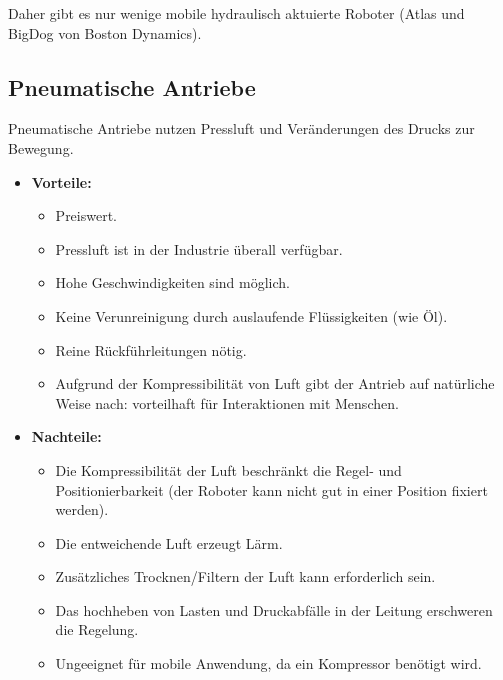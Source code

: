 			Daher gibt es nur wenige mobile hydraulisch aktuierte Roboter (\zB Atlas und BigDog von Boston Dynamics).

		\subsection{Pneumatische Antriebe}
			Pneumatische Antriebe nutzen Pressluft und Veränderungen des Drucks zur Bewegung.

			\begin{itemize}
				\item \textbf{Vorteile:}
					\begin{itemize}
						\item Preiswert.
						\item Pressluft ist in der Industrie überall verfügbar.
						\item Hohe Geschwindigkeiten sind möglich.
						\item Keine Verunreinigung durch auslaufende Flüssigkeiten (wie Öl).
						\item Reine Rückführleitungen nötig.
						\item Aufgrund der Kompressibilität von Luft gibt der Antrieb auf natürliche Weise nach: vorteilhaft für Interaktionen mit Menschen.
					\end{itemize}
				\item \textbf{Nachteile:}
					\begin{itemize}
						\item Die Kompressibilität der Luft beschränkt die Regel- und Positionierbarkeit (der Roboter kann nicht gut in einer Position fixiert werden).
						\item Die entweichende Luft erzeugt Lärm.
						\item Zusätzliches Trocknen/Filtern der Luft kann erforderlich sein.
						\item Das hochheben von Lasten und Druckabfälle in der Leitung erschweren die Regelung.
						\item Ungeeignet für mobile Anwendung, da ein Kompressor benötigt wird.
					\end{itemize}
			\end{itemize}

